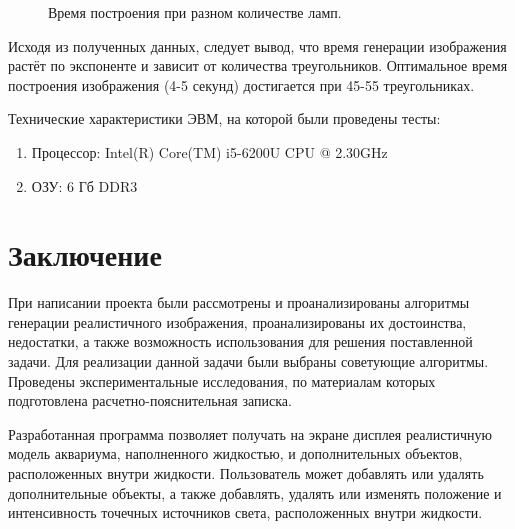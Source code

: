 \documentclass[14pt,a4paper]{extarticle}
\begin{document}
	\begin{figure}[H]
		\centering
		\label{graphic2}
	\caption{Время построения при разном количестве ламп.}
\end{figure}
	Исходя из полученных данных, следует вывод, 
	что время генерации изображения растёт по экспоненте и зависит от количества треугольников. 
	Оптимальное время построения изображения (4-5 секунд) достигается при 45-55 треугольниках.
	
	Технические характеристики ЭВМ, на которой были проведены тесты:
	\begin{enumerate}
		\item Процессор: Intel(R) Core(TM) i5-6200U CPU @ 2.30GHz
		\item ОЗУ: 6 Гб DDR3 
	\end{enumerate}
	 	
\clearpage
\section*{Заключение}
	При написании проекта были рассмотрены и проанализированы алгоритмы генерации реалистичного изображения, 
	проанализированы их достоинства, недостатки, а также возможность использования для решения поставленной задачи. 
	Для реализации данной задачи были выбраны советующие алгоритмы.
	Проведены экспериментальные исследования, 
	по материалам которых подготовлена расчетно-пояснительная записка. 
	
	Разработанная программа позволяет получать на экране дисплея реалистичную модель аквариума, 
	наполненного жидкостью, и дополнительных объектов, расположенных внутри жидкости. 
	Пользователь может добавлять или удалять дополнительные объекты, 
	а также добавлять, удалять или изменять положение и интенсивность точечных источников света, 
	расположенных внутри жидкости.
\clearpage	
\end{document}
